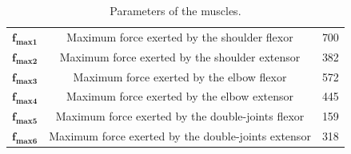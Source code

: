 \documentclass[pdftex,a4paper,11pt]{report}
\begin{document}
\begin{table}[hbt]
\caption{Parameters of the muscles.}
\begin{center}
\begin{tabular}{|c|c|c|}
\hline  
$\textbf{f}_{\textbf{max1}}$ & Maximum force exerted by the shoulder flexor & 700\\
$\textbf{f}_{\textbf{max2}}$ & Maximum force exerted by the shoulder extensor & 382\\
$\textbf{f}_{\textbf{max3}}$ & Maximum force exerted by the elbow flexor & 572\\
$\textbf{f}_{\textbf{max4}}$ & Maximum force exerted by the elbow extensor & 445\\
$\textbf{f}_{\textbf{max5}}$ & Maximum force exerted by the double-joints flexor & 159\\
$\textbf{f}_{\textbf{max6}}$ & Maximum force exerted by the double-joints extensor & 318\\
\hline
\end{tabular}
\end{center}
\label{MuscleParamTable}
\end{table}



\end{document}
